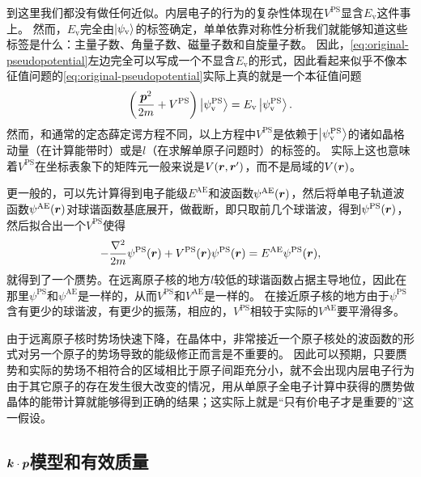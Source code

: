 到这里我们都没有做任何近似。内层电子的行为的复杂性体现在$V^\text{PS}$显含$E_\text{v}$这件事上。
然而，$E_\text{v}$完全由$\ket{\psi_\text{v}}$的标签确定，单单依靠对称性分析我们就能够知道这些标签是什么：主量子数、角量子数、磁量子数和自旋量子数。
因此，\eqref{eq:original-pseudopotential}左边完全可以写成一个不显含$E_\text{v}$的形式，因此看起来似乎不像本征值问题的\eqref{eq:original-pseudopotential}实际上真的就是一个本征值问题
\begin{equation}
    \left( \frac{\vb*{p}^2}{2m} + V^\text{PS} \right) \ket{\psi_\text{v}^\text{PS}} = E_\text{v} \ket{\psi_\text{v}^\text{PS}}.
\end{equation}
然而，和通常的定态薛定谔方程不同，以上方程中$V^\text{PS}$是依赖于$\ket{\psi_\text{v}^\text{PS}}$的诸如晶格动量（在计算能带时）或是$l$（在求解单原子问题时）的标签的。
实际上这也意味着$V^\text{PS}$在坐标表象下的矩阵元一般来说是$V(\vb*{r}, \vb*{r}')$，而不是局域的$V(\vb*{r})$。

更一般的，可以先计算得到电子能级$E^\text{AE}$和波函数$\psi^\text{AE}(\vb*{r})$，然后将单电子轨道波函数$\psi^\text{AE}(\vb*{r})$对球谐函数基底展开，做截断，即只取前几个球谐波，得到$\psi^\text{PS}(\vb*{r})$，然后拟合出一个$V^\text{PS}$使得
\begin{equation}
    - \frac{\laplacian}{2m} \psi^\text{PS}(\vb*{r}) + V^\text{PS}(\vb*{r}) \psi^\text{PS}(\vb*{r}) = E^\text{AE} \psi^\text{PS}(\vb*{r}),
\end{equation}
就得到了一个赝势。在远离原子核的地方$l$较低的球谐函数占据主导地位，因此在那里$\psi^\text{PS}$和$\psi^\text{AE}$是一样的，从而$V^\text{PS}$和$V^\text{AE}$是一样的。
在接近原子核的地方由于$\psi^\text{PS}$含有更少的球谐波，有更少的振荡，相应的，$V^\text{PS}$相较于实际的$V^\text{AE}$要平滑得多。

由于远离原子核时势场快速下降，在晶体中，非常接近一个原子核处的波函数的形式对另一个原子的势场导致的能级修正而言是不重要的。
因此可以预期，只要赝势和实际的势场不相符合的区域相比于原子间距充分小，就不会出现内层电子行为由于其它原子的存在发生很大改变的情况，用从单原子全电子计算中获得的赝势做晶体的能带计算就能够得到正确的结果；这实际上就是“只有价电子才是重要的”这一假设。

\subsection{$\vb*{k} \cdot \vb*{p}$模型和有效质量}

